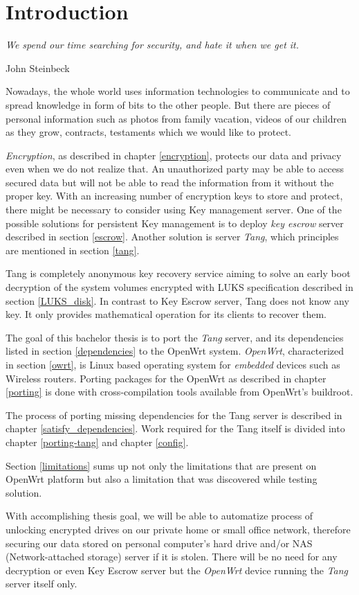 \chapter{Introduction}\label{introduction}
\epigraph{\it We spend our time searching for security, and hate it when we get it.}{{John Steinbeck}\cite{quote}}

Nowadays, the whole world uses information technologies to communicate and to spread knowledge in form of bits to the other people.
But there are pieces of personal information such as photos from family vacation, videos of our children as they grow, contracts, testaments which we would like to protect.

{\it Encryption}, as described in chapter \ref{encryption}, protects our data and privacy even when we do not realize that.
An unauthorized party may be able to access secured data but will not be able to read the information from it without the proper key.
With an increasing number of encryption keys to store and protect, there might be necessary to consider using Key management server.
One of the possible solutions for persistent Key management is to deploy {\it key escrow} server described in section \ref{escrow}.
Another solution is server {\it Tang}, which principles are mentioned in section \ref{tang}.

Tang is completely anonymous key recovery service aiming to solve an early boot decryption of the system volumes encrypted with LUKS specification described in section \ref{LUKS_disk}.
In contrast to Key Escrow server, Tang does not know any key.
It only provides mathematical operation for its clients to recover them.

The goal of this bachelor thesis is to port the {\it Tang} server, and its dependencies listed in section \ref{dependencies} to the OpenWrt system.
{\it OpenWrt}, characterized in section \ref{owrt}, is Linux based operating system for {\it embedded} devices such as Wireless routers.
Porting packages for the OpenWrt as described in chapter \ref{porting} is done with cross-compilation tools available from OpenWrt's buildroot.

The process of porting missing dependencies for the Tang server is described in chapter \ref{satisfy_dependencies}.
Work required for the Tang itself is divided into chapter \ref{porting-tang} and chapter \ref{config}.

Section \ref{limitations} sums up not only the limitations that are present on OpenWrt platform but also a limitation that was discovered while testing solution.

With accomplishing thesis goal, we will be able to automatize process of unlocking encrypted drives on our private home or small office network, therefore securing our data stored on personal computer's hard drive and/or NAS (Network-attached storage) server if it is stolen.
There will be no need for any decryption or even Key Escrow server but the {\it OpenWrt} device running the {\it Tang} server itself only.
